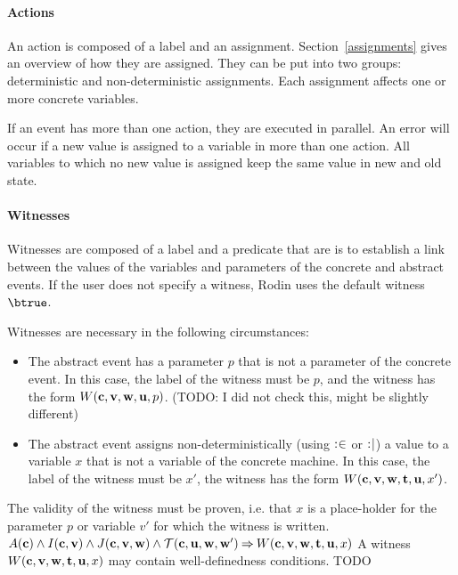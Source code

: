 \paragraph{Actions}
\label{actions}
An action is composed of a label and an assignment.
Section~\ref{assignments} gives an overview of how they are assigned.
They can be put into two groups: deterministic and non-deterministic assignments.
Each assignment affects one or more concrete variables.

If an event has more than one action, they are executed in parallel. 
An error will occur if a new value is assigned to a variable in more than one action.
All variables to which no new value is assigned keep the same value in new and old state.

\paragraph{Witnesses}
Witnesses are composed of a label and a predicate that are is to establish a link between the values 
  of the variables and parameters of the concrete and abstract events.
If the user does not specify a witness, Rodin uses the default witness $\btrue$.

Witnesses are necessary in the following circumstances:
\begin{itemize}
\item The abstract event has a parameter $p$ that is not a parameter of the concrete
  event.
  In this case, the label of the witness must be $p$, and the witness has the form $W(\mathbf{c},{\mathbf{v},\mathbf{w}},\mathbf{u},p)$.
  (TODO: I did not check this, might be slightly different)
\item The abstract event assigns non-deterministically (using $\mathrel{:\mkern1mu\in}$ or $\mathrel{:\mkern1mu\mid}$) 
  a value to a variable $x$ that is not a variable of the concrete machine.
  In this case, the label of the witness must be $x'$, the witness has the form $W(\mathbf{c},{\mathbf{v},\mathbf{w}},{\mathbf{t},\mathbf{u}},x')$.
\end{itemize}

The validity of the witness must be proven, i.e. that $x$ is a place-holder for the parameter $p$ or variable $v'$ for which the witness is written.
%
  {$A(\mathbf{c}) \land I(\mathbf{c},\mathbf{v}) \land J(\mathbf{c},{\mathbf{v},\mathbf{w}}) \land
    \mathcal{T}(\mathbf{c},\mathbf{u},\mathbf{w},\mathbf{w}') \mathbin\Rightarrow
    W(\mathbf{c},{\mathbf{v},\mathbf{w}},{\mathbf{t},\mathbf{u}},x)$}
A witness $W(\mathbf{c},{\mathbf{v},\mathbf{w}},{\mathbf{t},\mathbf{u}},x)$ may contain well-definedness conditions.
%
  {TODO}

